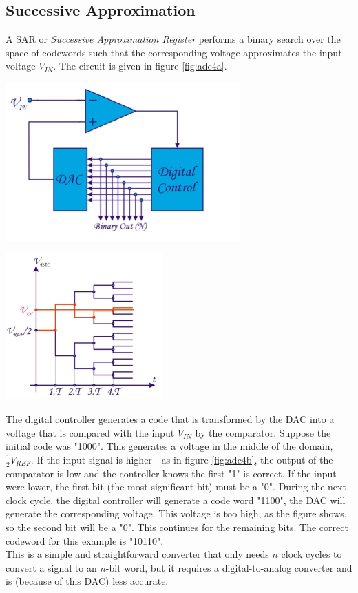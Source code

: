 \subsection{Successive Approximation}
\label{sec:sar}
A SAR or \emph{Successive Approximation Register} performs a binary search over the space of codewords such that the corresponding voltage approximates the input voltage $V_{IN}$. The circuit is given in figure \ref{fig:adc4a}.\\

\begin{minipage}{.6\textwidth}
	\centering
	\includegraphics[width=9cm]{figures/ch18/adc4a.jpg}
	\label{fig:adc4a}
\end{minipage}%
\begin{minipage}{.4\textwidth}
	\centering
	\includegraphics[width=6cm]{figures/ch18/adc4b.jpg}
	\label{fig:adc4b}
\end{minipage}

The digital controller generates a code that is transformed by the DAC into a voltage that is compared with the input $V_{IN}$ by the comparator. Suppose the initial code was "1000". This generates a voltage in the middle of the domain, $\frac{1}{2} V_{REF}$. If the input signal is higher - as in figure \ref{fig:adc4b}, the output of the comparator is low and the controller knows the first "1" is correct. If the input were lower, the first bit (the most significant bit) must be a "0". During the next clock cycle, the digital controller will generate a code word "1100", the DAC will generate the corresponding voltage. This voltage is too high, as the figure shows, so the second bit will be a "0". This continues for the remaining bits. The correct codeword for this example is "10110".\\
This is a simple and straightforward converter that only needs $n$ clock cycles to convert a signal to an $n$-bit word, but it requires a digital-to-analog converter and is (because of this DAC) less accurate.

